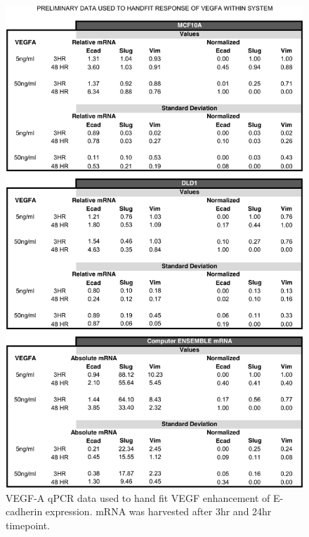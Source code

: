 \newpage

\begin{figure}
	\center
	\includegraphics [width=0.75\linewidth] {./figs/Fig-Supplemental-Data-VEGFA.pdf}
	\caption{VEGF-A qPCR data used to hand fit VEGF enhancement of E-cadherin expression. mRNA was harvested after 3hr and 24hr timepoint.}\label{fg:VEGFA-Data}
\end{figure}


%
